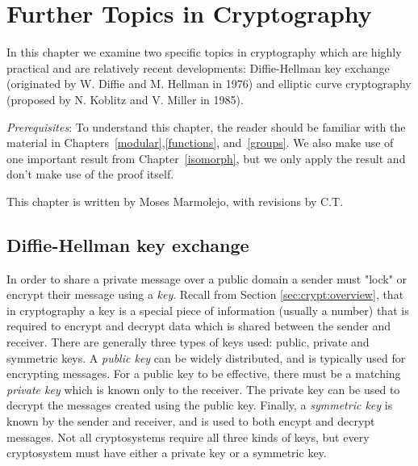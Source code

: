\chapter{ Further Topics in Cryptography}\label{further_crypt}

In this chapter we examine two specific topics in cryptography which are highly practical and are relatively recent developments: Diffie-Hellman key exchange (originated by W. Diffie and M. Hellman in 1976) and elliptic curve cryptography (proposed by N. Koblitz and V. Miller in 1985).
\medskip

\noindent
\emph{Prerequisites}: 
To understand this chapter, the reader should be familiar with the material in  Chapters~\ref{modular},\ref{functions}, and~\ref{groups}. We also make use of one important result from Chapter~\ref{isomorph}, but we only apply the result and don't make use of the proof itself.  
\bigskip

This chapter is written by Moses Marmolejo, with revisions by C.T.

\section{Diffie-Hellman key exchange}
\label{sec:DHKE:1}

In order to share a private message over a public domain a sender must  "lock" or encrypt their message using a \emph{key}.  Recall from Section \ref{sec:crypt:overview}, that in cryptography a  key is a special piece of information (usually a number)  that is required to encrypt and decrypt data which is shared between the sender and receiver. There are generally three types of keys used: public, private and symmetric keys. A \emph{public key} can be widely distributed, and is typically used for encrypting messages.  For a public key to be effective, there must be a matching \emph{private key} which is known only to the receiver. The private key can be used to decrypt the messages created using the public key.  Finally, a \emph{symmetric key} is known by the sender and receiver, and is used to both encypt and decrypt messages.  Not all cryptosystems require all three kinds of keys, but every cryptosystem must have either a private key or a symmetric key.

